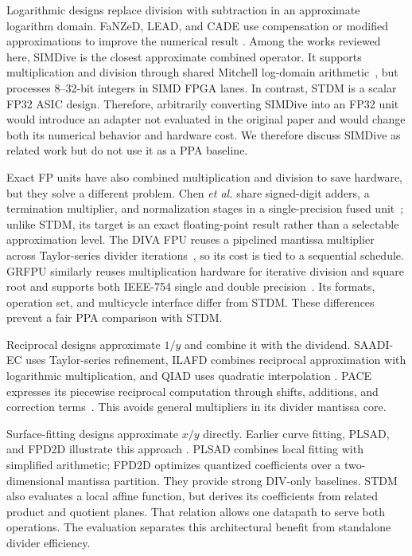 \documentclass[conference]{IEEEtran}
\begin{document}
Logarithmic designs replace division with subtraction in an approximate
logarithm domain. FaNZeD, LEAD, and CADE use compensation or modified
approximations to improve the numerical result
\cite{saadat2019fanzed,ratnaparkhi2022lead,imani2019cade}.
Among the works reviewed here, SIMDive is the closest approximate combined
operator. It supports multiplication and division through shared
Mitchell log-domain arithmetic~\cite{ebrahimi2020simdive}, but processes
8--32-bit integers in SIMD FPGA lanes. In contrast, STDM is a
scalar FP32 ASIC design. Therefore, arbitrarily converting SIMDive into an FP32
unit would introduce an adapter not evaluated in the original paper and would
change both its numerical behavior and hardware cost. We therefore discuss
SIMDive as related work but do not use it as a PPA baseline.

Exact FP units have also combined multiplication and division to save
hardware, but they solve a different problem. Chen \emph{et al.} share
signed-digit adders, a termination multiplier, and normalization stages in a
single-precision fused unit~\cite{chen2004fused}; unlike STDM, its target is an
exact floating-point result rather than a selectable approximation level. The
DIVA FPU reuses a pipelined mantissa multiplier across Taylor-series divider
iterations~\cite{kwon2004diva}, so its cost is tied to a sequential schedule. GRFPU similarly reuses
multiplication hardware for iterative division and square root and supports
both IEEE-754 single and double precision~\cite{gaislergrfpu}. Its formats,
operation set, and multicycle interface differ from STDM. These differences
prevent a fair PPA comparison with STDM.

Reciprocal designs approximate $1/y$ and combine it with the dividend.
SAADI-EC uses Taylor-series refinement, ILAFD combines reciprocal approximation
with logarithmic multiplication, and QIAD uses quadratic interpolation
\cite{melchert2019saadi,oelund2023ilafd,liu2023qiad}.
PACE expresses its piecewise reciprocal computation through shifts, additions,
and correction terms~\cite{wen2025pace}. This avoids general multipliers in
its divider mantissa core.

Surface-fitting designs approximate $x/y$ directly.
Earlier curve fitting, PLSAD, and FPD2D illustrate this approach
\cite{wu2015curve,wu2024plsad,dimeo2025fpd2d}.
PLSAD combines local fitting with simplified arithmetic; FPD2D optimizes
quantized coefficients over a two-dimensional mantissa partition.
They provide strong DIV-only baselines. STDM also evaluates a local affine
function, but derives its coefficients from related product and quotient
planes. That relation allows one datapath to serve both operations. The
evaluation separates this architectural benefit from standalone divider
efficiency.
\end{document}
